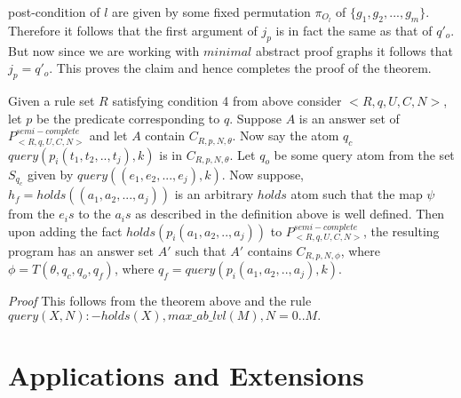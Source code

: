 \documentclass[sigconf]{acmart}
\begin{document}
post-condition of $l$ are given by some fixed permutation $\pi_{O_{l}}$ of $\{g_{1},g_{2},...,g_{m}\}$. Therefore it follows that the first argument of $j_{p}$ is in fact the same as that of $q'_{o}$. But now since we are working with $\textit{minimal}$ abstract proof graphs it follows that $j_{p} = q'_{o}$. This proves the claim and hence completes the proof of the theorem.    




 
\begin{corollary}\label{addfact}
Given a rule set $R$ satisfying condition 4 from above consider $<R,q,U,C,N>$, let $p$ be the predicate corresponding to $q$. Suppose $A$ is an answer set of $P^{semi-complete}_{<R,q,U,C,N>}$ and let $A$ contain $C_{R,p,N,\theta}$. Now say the atom $q_{c}$ $query(p_{i}(t_{1},t_{2},..,t_{j}),k)$ is in $C_{R,p,N,\theta}$. Let $q_{o}$ be some query atom from the set $S_{q_{c}}$ given by $query((e_{1},e_{2},...,e_{j}),k)$. Now suppose, $h_{f}= holds((a_{1},a_{2},...,a_{j}))$ is an arbitrary $holds$ atom such that the map $\psi$ from the $e_{i}s$ to the $a_{i}s$ as described in the definition above is well defined. Then upon adding the fact $holds(p_{i}(a_{1},a_{2},..,a_{j}))$ to $P^{semi-complete}_{<R,q,U,C,N>}$, the resulting program has an answer set $A'$ such that $A'$ contains $C_{R,p,N,\phi}$, where $\phi = T(\theta, q_{c}, q_{o}, q_{f})$, where $q_{f} = query(p_{i}(a_{1},a_{2},..,a_{j}),k)$. 
\end{corollary}
\textit{Proof} This follows from the theorem above and the rule\\ $query(X,N):-holds(X),max\_ab\_lvl(M),N = 0..M.$
\section{Applications and Extensions}\label{sec:applications_extensions}
\end{document}
